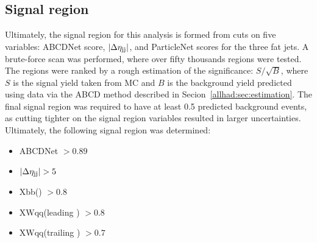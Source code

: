 \subsection{Signal region}
Ultimately, the signal region for this analysis is formed from cuts on five variables: ABCDNet score, $|\Delta\eta_{\mathrm{j}\mathrm{j}}|$, and ParticleNet scores for the three fat jets. 
A brute-force scan was performed, where over fifty thousands regions were tested. 
The regions were ranked by a rough estimation of the significance: $S/\sqrt{B}$, where $S$ is the signal yield taken from MC and $B$ is the background yield predicted using data via the ABCD method described in Secion~\ref{allhad:sec:estimation}.
The final signal region was required to have at least 0.5 predicted background events, as cutting tighter on the signal region variables resulted in larger uncertainties. 
Ultimately, the following signal region was determined:
\begin{itemize}
    \item ABCDNet $> 0.89$
    \item $|\Delta\eta_{\mathrm{j}\mathrm{j}}| > 5$
    \item Xbb(\Htobb) $> 0.8$
    \item XWqq(leading \Vtoqq) $> 0.8$
    \item XWqq(trailing \Vtoqq) $> 0.7$
\end{itemize}

